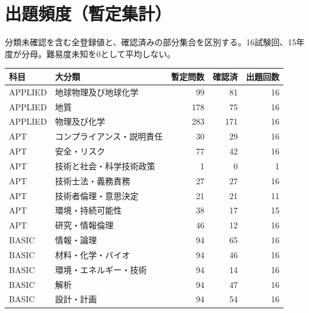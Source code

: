 \chapter{出題頻度（暫定集計）}
分類未確認を含む全登録値と、確認済みの部分集合を区別する。16試験回、15年度が分母。難易度未知を0として平均しない。
\begin{longtable}{p{.16\linewidth}p{.42\linewidth}rrr}
科目 & 大分類 & 暫定問数 & 確認済 & 出題回数\\\hline
APPLIED & 地球物理及び地球化学 & 99 & 81 & 16\\
APPLIED & 地質 & 178 & 75 & 16\\
APPLIED & 物理及び化学 & 283 & 171 & 16\\
APT & コンプライアンス・説明責任 & 30 & 29 & 16\\
APT & 安全・リスク & 77 & 42 & 16\\
APT & 技術と社会・科学技術政策 & 1 & 0 & 1\\
APT & 技術士法・義務責務 & 27 & 27 & 16\\
APT & 技術者倫理・意思決定 & 21 & 21 & 11\\
APT & 環境・持続可能性 & 38 & 17 & 15\\
APT & 研究・情報倫理 & 46 & 12 & 16\\
BASIC & 情報・論理 & 94 & 65 & 16\\
BASIC & 材料・化学・バイオ & 94 & 46 & 16\\
BASIC & 環境・エネルギー・技術 & 94 & 14 & 16\\
BASIC & 解析 & 94 & 47 & 16\\
BASIC & 設計・計画 & 94 & 54 & 16\\
\end{longtable}
